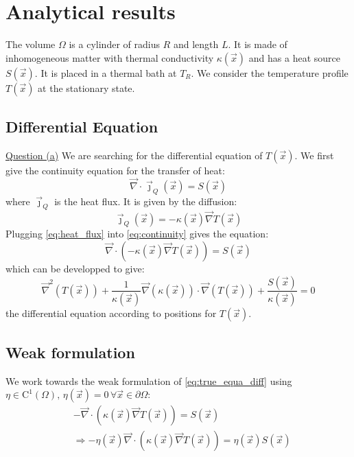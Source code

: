 \section{Analytical results}

The volume $\Omega$ is a cylinder of radius $R$ and length $L$. It is made of inhomogeneous matter with thermal conductivity $\kappa(\vec{x})$ and has a heat source $S(\vec{x})$. It is placed in a thermal bath at $T_R$. We consider the temperature profile $T(\vec{x})$ at the stationary state.

\subsection{Differential Equation}
\underline{Question (a)}
We are searching for the differential equation of $T(\vec{x})$. We first give the continuity equation for the transfer of heat:
\begin{equation}
    \vec{\nabla} \cdot \vec{\jmath}_Q(\vec{x}) = S(\vec{x})
    \label{eq:continuity}
\end{equation}
where $\vec{\jmath}_Q$ is the heat flux. It is given by the diffusion:
\begin{equation}
    \vec{\jmath}_Q(\vec{x}) = -\kappa (\vec{x}) \vec{\nabla}T(\vec{x})
    \label{eq:heat_flux}
\end{equation}
Plugging \autoref{eq:heat_flux} into \autoref{eq:continuity} gives the equation:
\begin{equation}
    \vec{\nabla} \cdot (-\kappa(\vec{x})\vec{\nabla}T(\vec{x})) = S(\vec{x})
    \label{eq:true_equa_diff}
\end{equation}
which can be developped to give:
\begin{equation}
    \vec{\nabla}^2(T(\vec{x})) + \frac{1}{\kappa(\vec{x})} \vec{\nabla}(\kappa(\vec{x})) \cdot \vec{\nabla}(T(\vec{x})) + \frac{S(\vec{x})}{\kappa(\vec{x})} = 0
    \label{eq:equa_diff_T}
\end{equation}
the differential equation according to positions for $T(\vec{x})$.

\subsection{Weak formulation}
We work towards the weak formulation of \autoref{eq:true_equa_diff} using $\eta \in \mathrm{C}^1(\Omega), \, \eta(\vec{x}) = 0 \,\forall \vec{x} \in \partial\Omega$:
\begin{equation}
    \begin{aligned}
        & -\vec{\nabla} \cdot (\kappa(\vec{x})\vec{\nabla}T(\vec{x})) = S(\vec{x}) \\
        & \Rightarrow -\eta(\vec{x}) \vec{\nabla} \cdot (\kappa(\vec{x})\vec{\nabla}T(\vec{x})) = \eta(\vec{x}) S(\vec{x})
    \end{aligned}
    \label{eq:weak_formulation_local}
\end{equation}

